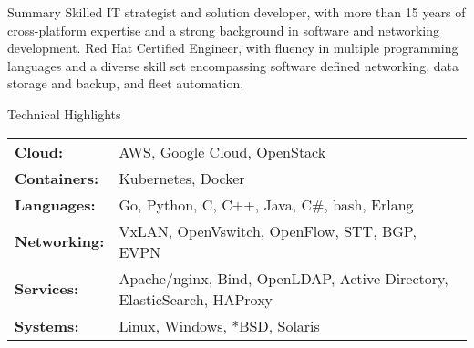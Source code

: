 \documentclass{resume}
\begin{document}
    \begin{rSection}{Summary}
        Skilled IT strategist and solution developer, with more than 15 years of
        cross-platform expertise and a strong background in software and networking
        development. Red Hat Certified Engineer, with fluency in multiple programming
        languages and a diverse skill set encompassing software defined networking,
        data storage and backup, and fleet automation.
    \end{rSection}

    \begin{rSection}{Technical Highlights}
        \bigskip
        \begin{mdframed}[style=techskills]
            \begin{tabular}{l l}
                {\bf Cloud:} & AWS, Google Cloud, OpenStack \\
                {\bf Containers:} & Kubernetes, Docker \\
                {\bf Languages:} & Go, Python, C, C++, Java, C\#, bash, Erlang \\
                {\bf Networking:} & VxLAN, OpenVswitch, OpenFlow, STT, BGP, EVPN \\
                {\bf Services:} & Apache/nginx, Bind, OpenLDAP, Active Directory,
                ElasticSearch, HAProxy \\
                {\bf Systems:} & Linux, Windows, *BSD, Solaris \\
            \end{tabular}
        \end{mdframed}
    \end{rSection}
\end{document}
